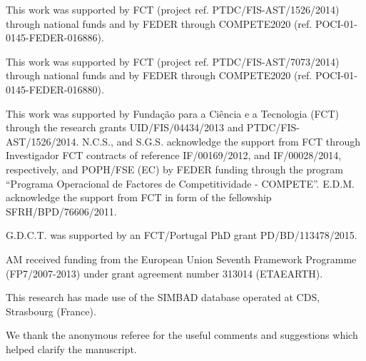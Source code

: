 \documentclass{aa}
\begin{document}
\begin{acknowledgements}

This work was supported by FCT (project ref. PTDC/FIS-AST/1526/2014) through
national funds and by FEDER through COMPETE2020 (ref.
POCI-01-0145-FEDER-016886).

This work was supported by FCT (project ref. PTDC/FIS-AST/7073/2014) through
national funds and by FEDER through COMPETE2020 (ref.
POCI-01-0145-FEDER-016880).

This work was supported by Funda\c{c}\~ao para a Ci\^encia e a Tecnologia (FCT)
through the research grants UID/FIS/04434/2013 and PTDC/FIS-AST/1526/2014.
N.C.S., and S.G.S. acknowledge the support from FCT through Investigador FCT
contracts of reference IF/00169/2012, and IF/00028/2014, respectively, and
POPH/FSE (EC) by FEDER funding through the program “Programa Operacional de
Factores de Competitividade - COMPETE”. E.D.M. acknowledge the support from FCT
in form of the fellowship SFRH/BPD/76606/2011.

G.D.C.T. was supported by an FCT/Portugal PhD grant PD/BD/113478/2015.

AM received funding from the European Union Seventh Framework Programme
(FP7/2007-2013) under grant agreement number 313014 (ETAEARTH).

This research has made use of the SIMBAD database operated at CDS, Strasbourg
(France).

We thank the anonymous referee for the useful comments and suggestions which
helped clarify the manuscript.

\end{acknowledgements}




\end{document}
